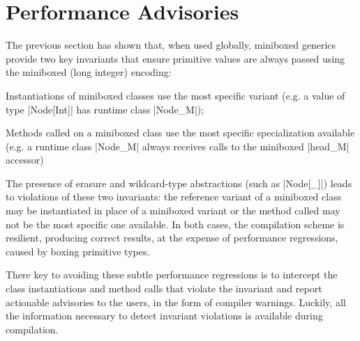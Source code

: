 \vspace{-0.5em}
\section{Performance Advisories}
\label{sec:advisories}

The previous section has shown that, when used globally, miniboxed generics provide two key invariants that ensure primitive values are always passed using the miniboxed (long integer) encoding:

\begin{compactitem}
\item Instantiations of miniboxed classes use the most specific variant (e.g. a value of type |Node[Int]| has runtime class |Node_M|);
\item Methods called on a miniboxed class use the most specific specialization available (e.g. a runtime class |Node_M| always receives calls to the miniboxed |head_M| accessor)
\end{compactitem}

The presence of erasure and wildcard-type abstractions (such as |Node[_]|) leads to violations of these two invariants: the reference variant of a miniboxed class may be instantiated in place of a miniboxed variant or the method called may not be the most specific one available. In both cases, the compilation scheme is resilient, producing correct results, at the expense of performance regressions, caused by boxing primitive types.

There key to avoiding these subtle performance regressions is to intercept the class instantiations and method calls that violate the invariant and report actionable advisories to the users, in the form of compiler warnings. Luckily, all the information necessary to detect invariant violations is available during compilation.



